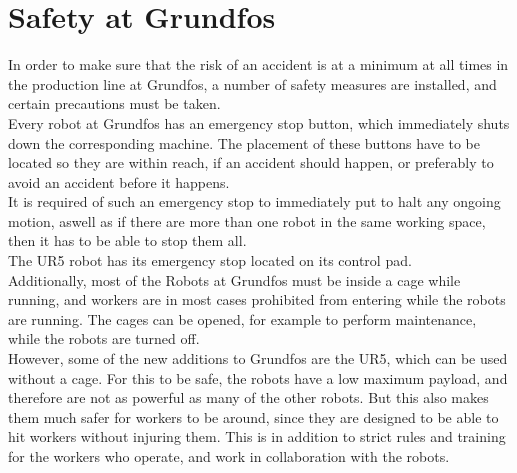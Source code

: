 \chapter{Safety at Grundfos}\label{ch:Safety at Grundfos}
In order to make sure that the risk of an accident is at a minimum at all times in the production line at Grundfos, a number of safety measures are installed, and certain precautions must be taken.\\

Every robot at Grundfos has an emergency stop button, which immediately shuts down the corresponding machine. The placement of these buttons have to be located so they are within reach, if an accident should happen, or preferably to avoid an accident before it happens. \\
It is required of such an emergency stop to immediately put to halt any ongoing motion, aswell as if there are more than one robot in the same working space, then it has to be able to stop them all.\\
The UR5 robot has its emergency stop located on its control pad.\\

Additionally, most of the Robots at Grundfos must be inside a cage while running, and workers are in most cases prohibited from entering while the robots are running. The cages can be opened, for example to perform maintenance, while the robots are turned off.\\

However, some of the new additions to Grundfos are the UR5, which can be used without a cage. For this to be safe, the robots have a low maximum payload, and therefore are not as powerful as many of the other robots. But this also makes them much safer for workers to be around, since they are designed to be able to hit workers without injuring them. This is in addition to strict rules and training for the workers who operate, and work in collaboration with the robots. \\
